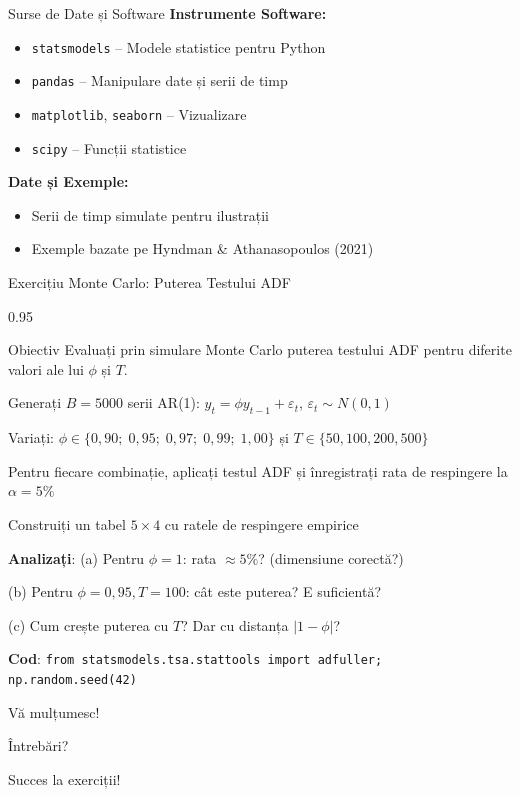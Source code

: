 \documentclass[9pt, aspectratio=169, t]{beamer}
\begin{document}
\begin{frame}{Surse de Date și Software}
    \textbf{Instrumente Software:}
    \begin{itemize}
        \item \texttt{statsmodels} -- Modele statistice pentru Python
        \item \texttt{pandas} -- Manipulare date și serii de timp
        \item \texttt{matplotlib}, \texttt{seaborn} -- Vizualizare
        \item \texttt{scipy} -- Funcții statistice
    \end{itemize}

    \vspace{0.3cm}
    \textbf{Date și Exemple:}
    \begin{itemize}
        \item Serii de timp simulate pentru ilustrații
        \item Exemple bazate pe Hyndman \& Athanasopoulos (2021)
    \end{itemize}
\end{frame}

\begin{frame}{Exercițiu Monte Carlo: Puterea Testului ADF}
    \begin{cminipage}{0.95\textwidth}
        \begin{block}{Obiectiv}
            Evaluați prin simulare Monte Carlo puterea testului ADF pentru diferite valori ale lui $\phi$ și $T$.
        \end{block}
        \begin{enumerate}\setlength{\itemsep}{2pt}
            {\small
            \item Generați $B = 5000$ serii AR(1): $y_t = \phi y_{t-1} + \varepsilon_t$, $\varepsilon_t \sim N(0,1)$
            \item Variați: $\phi \in \{0{,}90;\; 0{,}95;\; 0{,}97;\; 0{,}99;\; 1{,}00\}$ și $T \in \{50, 100, 200, 500\}$
            \item Pentru fiecare combinație, aplicați testul ADF și înregistrați rata de respingere la $\alpha = 5\%$
            \item Construiți un tabel $5 \times 4$ cu ratele de respingere empirice
            \item \textbf{Analizați}: (a) Pentru $\phi = 1$: rata $\approx 5\%$? (dimensiune corectă?)
            \item[] (b) Pentru $\phi = 0{,}95, T = 100$: cât este puterea? E suficientă?
            \item[] (c) Cum crește puterea cu $T$? Dar cu distanța $|1 - \phi|$?
            }
        \end{enumerate}
        {\footnotesize \textbf{Cod}: \texttt{from statsmodels.tsa.stattools import adfuller; np.random.seed(42)}}
    \end{cminipage}
\end{frame}

\begin{frame}{}
    \centering
    \Huge\textcolor{MainBlue}{Vă mulțumesc!}

    \vspace{1cm}

    \Large Întrebări?

    \vspace{1cm}

    \normalsize
    Succes la exerciții!
\end{frame}
\end{document}
